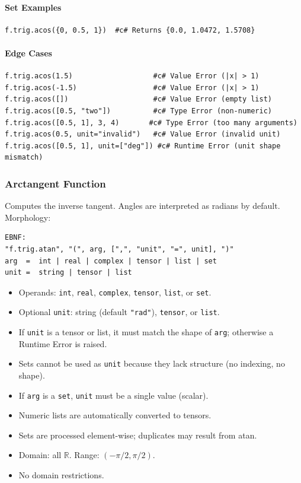 \paragraph{Set Examples}
\begin{verbatim}
f.trig.acos({0, 0.5, 1})  #c# Returns {0.0, 1.0472, 1.5708}
\end{verbatim}

\paragraph{Edge Cases}
\begin{verbatim}
f.trig.acos(1.5)                   #c# Value Error (|x| > 1)
f.trig.acos(-1.5)                  #c# Value Error (|x| > 1)
f.trig.acos([])                    #c# Value Error (empty list)
f.trig.acos([0.5, "two"])          #c# Type Error (non-numeric)
f.trig.acos([0.5, 1], 3, 4)       #c# Type Error (too many arguments)
f.trig.acos(0.5, unit="invalid")   #c# Value Error (invalid unit)
f.trig.acos([0.5, 1], unit=["deg"]) #c# Runtime Error (unit shape mismatch)
\end{verbatim}

\subsubsection{Arctangent Function}
Computes the inverse tangent. Angles are interpreted as radians by default.\\
Morphology:
\begin{verbatim}
EBNF:
"f.trig.atan", "(", arg, [",", "unit", "=", unit], ")"
arg  =  int | real | complex | tensor | list | set
unit =  string | tensor | list
\end{verbatim}
\begin{itemize}
\item Operands: \texttt{int}, \texttt{real}, \texttt{complex}, \texttt{tensor}, \texttt{list}, or \texttt{set}.
\item Optional \texttt{unit}: string (default \texttt{"rad"}), \texttt{tensor}, or \texttt{list}.
\item If \texttt{unit} is a tensor or list, it must match the shape of \texttt{arg}; otherwise a Runtime Error is raised.
\item Sets cannot be used as \texttt{unit} because they lack structure (no indexing, no shape).
\item If \texttt{arg} is a \texttt{set}, \texttt{unit} must be a single value (scalar).
\item Numeric lists are automatically converted to tensors.
\item Sets are processed element-wise; duplicates may result from atan.
\item Domain: all $\mathbb{R}$. Range: $(-\pi/2, \pi/2)$.
\item No domain restrictions.
\end{itemize}

